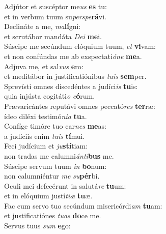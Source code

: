 \evenverse Adjútor et suscéptor me\textit{us} \textbf{es} tu:~\*\\
\evenverse et in verbum tuum su\textit{per}\textit{spe}\textbf{rá}vi.\\
\oddverse Declináte a me, \textit{ma}\textbf{lí}gni:~\*\\
\oddverse et scrutábor mandáta \textit{De}\textit{i} \textbf{me}i.\\
\evenverse Súscipe me secúndum elóquium tuum, \textit{et} \textbf{vi}vam:~\*\\
\evenverse et non confúndas me ab exspectati\textit{ó}\textit{ne} \textbf{me}a.\\
\oddverse Adjuva me, et sal\textit{vus} \textbf{e}ro:~\*\\
\oddverse et meditábor in justificatiónibus \textit{tu}\textit{is} \textbf{sem}per.\\
\evenverse Sprevísti omnes discedéntes a judíci\textit{is} \textbf{tu}is:~\*\\
\evenverse quia injústa cogitáti\textit{o} \textit{e}\textbf{ó}rum.\\
\oddverse Prævaricántes reputávi omnes peccató\textit{res} \textbf{ter}ræ:~\*\\
\oddverse ídeo diléxi testimó\textit{ni}\textit{a} \textbf{tu}a.\\
\evenverse Confíge timóre tuo car\textit{nes} \textbf{me}as:~\*\\
\evenverse a judíciis enim \textit{tu}\textit{is} \textbf{tí}mui.\\
\oddverse Feci judícium et \textit{ju}\textbf{stí}tiam:~\*\\
\oddverse non tradas me calumni\textit{án}\textit{ti}\textbf{bus} me.\\
\evenverse Súscipe servum tuum \textit{in} \textbf{bo}num:~\*\\
\evenverse non calumniéntur \textit{me} \textit{su}\textbf{pér}bi.\\
\oddverse Oculi mei defecérunt in salutá\textit{re} \textbf{tu}um:~\*\\
\oddverse et in elóquium justí\textit{ti}\textit{æ} \textbf{tu}æ.\\
\evenverse Fac cum servo tuo secúndum misericórdi\textit{am} \textbf{tu}am:~\*\\
\evenverse et justificatiónes \textit{tu}\textit{as} \textbf{do}ce me.\\
\oddverse Servus tuus \textit{sum} \textbf{e}go:~\*\\
